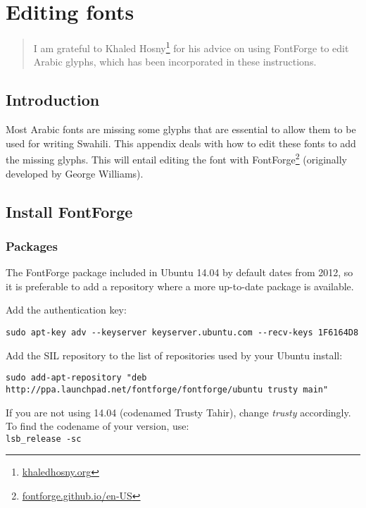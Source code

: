 \chapter{Editing fonts}
\renewcommand{\thesection}{B/\arabic{section}}  %
\setcounter{section}{0}  %
\label{appB}

\begin{quotation}
\noindent I am grateful to Khaled Hosny\footnote{\url{khaledhosny.org}} for his advice on using FontForge to edit Arabic glyphs, which has been incorporated in these instructions.
\end{quotation}

\section{Introduction}
\label{appb:intro}

Most Arabic fonts are missing some glyphs that are essential to allow them to be used for writing Swahili.  This appendix deals with how to edit these fonts to add the missing glyphs.  This will entail editing the font with FontForge\footnote{\url{fontforge.github.io/en-US}} (originally developed by George Williams).

\section{Install FontForge}

\subsection{Packages}

The FontForge package included in Ubuntu 14.04 by default dates from 2012, so it is preferable to add a repository where a more up-to-date package is available.

Add the authentication key:

\verb|sudo apt-key adv --keyserver keyserver.ubuntu.com --recv-keys 1F6164D8|

Add the SIL repository to the list of repositories used by your Ubuntu install:

\verb|sudo add-apt-repository "deb http://ppa.launchpad.net/fontforge/fontforge/ubuntu trusty main"|

If you are not using 14.04 (codenamed Trusty Tahir), change \textit{trusty} accordingly.  To find the codename of your version, use:\\
\verb|lsb_release -sc|

